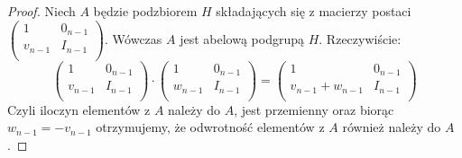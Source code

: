 \documentclass[licencjacka]{pracamgr}
\begin{document}
\begin{proof}
  Niech $A$ będzie podzbiorem $H$ składających się z macierzy postaci 
  $
    \left( \begin{array}{cc}
    1 & 0_{n-1} \\
    v_{n-1} & I_{n-1} \\
    \end{array} \right)
  $.
  Wówczas $A$ jest abelową podgrupą $H$.
  Rzeczywiście:
  $$
    \left( \begin{array}{cc} 1 & 0_{n-1} \\ v_{n-1} & I_{n-1} \\ \end{array} \right) \cdot
    \left( \begin{array}{cc} 1 & 0_{n-1} \\ w_{n-1} & I_{n-1} \\ \end{array} \right) =
    \left( \begin{array}{cc} 1 & 0_{n-1} \\ v_{n-1} + w_{n-1} & I_{n-1} \\ \end{array} \right)
  $$
  Czyli iloczyn elementów z $A$ należy do $A$, jest przemienny oraz biorąc $w_{n-1} = -v_{n-1}$
  otrzymujemy, że odwrotność elementów z $A$ również należy do $A$.
  

\end{proof}
\end{document}
